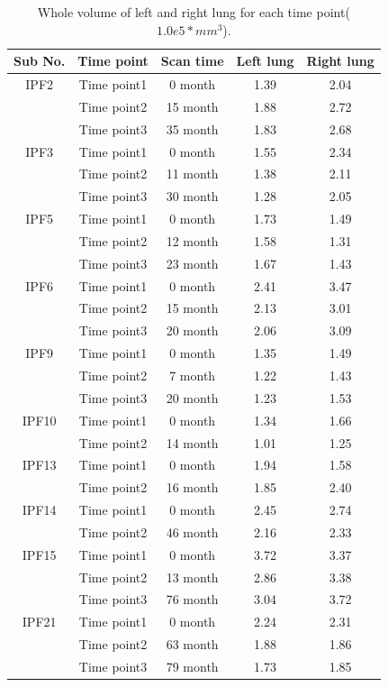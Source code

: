 \begin{table}[htbp]
\centering
\caption{Whole volume of left and right lung for each time point($1.0e 5 \ast mm^{3}$).}
\label{tab:WholeVolume}
\begin{tabular}{c c c c c}
\hline
\bf{Sub No.} & \bf{Time point} & \bf{Scan time}	& \bf{Left lung} &	\bf{Right lung}\\ 
\hline
IPF2 & Time point1 &	0 month &	1.39 &	2.04\\
\quad & Time point2 &	15 month &	1.88 &	2.72\\
\quad & Time point3 &	35 month &	1.83 &	2.68\\
\hline
IPF3 & Time point1 &	0 month &	1.55 &	2.34\\
\quad & Time point2 &	11 month &	1.38 &	2.11\\
\quad & Time point3 &	30 month &	1.28 &	2.05\\
\hline
IPF5 & Time point1 &  0 month & 1.73 & 1.49\\
\quad & Time point2 & 12 month & 1.58 & 1.31\\
\quad & Time point3 & 23 month & 1.67 & 1.43\\
\hline
IPF6 & Time point1 &	0 month &	2.41 &	3.47\\
\quad & Time point2 &	15 month &	2.13 &	3.01\\
\quad & Time point3 &	20 month &	2.06 &	3.09\\
\hline
IPF9 & Time point1 &	0 month &	1.35 &	1.49\\
\quad & Time point2 &	7 month &	1.22 &	1.43\\
\quad & Time point3 &	20 month &	1.23 &	1.53\\
\hline
IPF10 & Time point1 &	0 month &	1.34 &	1.66\\
\quad & Time point2 &	14 month &	1.01 &	1.25\\
\hline
IPF13 & Time point1 &	0 month &	1.94 &	1.58\\
\quad & Time point2 &	16 month &	1.85 &	2.40\\
\hline
IPF14 & Time point1 &	0 month &	2.45 &	2.74\\
\quad & Time point2 &	46 month &	2.16 &	2.33\\
\hline
IPF15 & Time point1 &	0 month &	3.72 &	3.37\\
\quad & Time point2 &	13 month &	2.86 &	3.38\\
\quad & Time point3 &	76 month &	3.04 &	3.72\\
\hline
IPF21 & Time point1 &	0 month &	2.24 &	2.31\\
\quad & Time point2 &	63 month &	1.88 &	1.86\\
\quad & Time point3 &	79 month &	1.73 &	1.85\\
\hline
\end{tabular}
\end{table}

